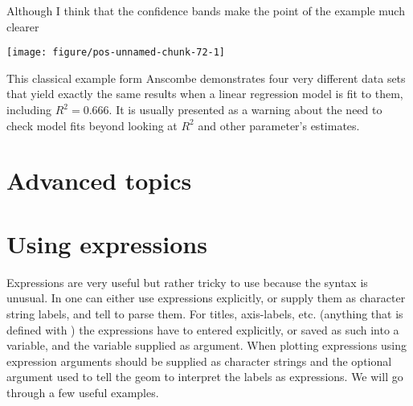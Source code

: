\documentclass[paper=a4,10pt,div=17,headsepline,BCOR=12mm,twoside,open=right]{scrbook}\usepackage{knitr}
\begin{document}
Although I think that the confidence bands make the point of the example much clearer

\begin{knitrout}\footnotesize
{}\color{fgcolor}\begin{kframe}
\begin{alltt}
  \hlopt{+}
  \hlstd{(}\hlstd{=}\hlstd{,} \hlstd{=}\hlstd{,} \hlstd{=}\hlstd{)} \hlopt{+}
  \hlstd{(}\hlstd{=}\hlstd{)} \hlopt{+}
  \hlstd{(}\hlopt{~} \hlstd{=}\hlstd{)} \hlopt{+}
  \hlstd{()}
\end{alltt}
\end{kframe}

{\centering \texttt{[image: figure/pos-unnamed-chunk-72-1]} 

}



\end{knitrout}

This classical example form Anscombe \cite{xxx} demonstrates four very different data sets that yield exactly the same results when a linear regression model is fit to them, including $R^2 = 0.666$. It is usually presented as a warning about the need to check model fits beyond looking at $R^2$ and other parameter's estimates.


\section{Advanced topics}

\section{Using  expressions}

Expressions are very useful but rather tricky to use because the syntax is unusual. In  one can either use expressions explicitly, or supply them as character string labels, and tell  to parse them. For titles, axis-labels, etc. (anything that is defined with ) the expressions have to entered explicitly, or saved as such into a variable, and the variable supplied as argument. When plotting expressions using  expression arguments should be supplied as character strings and the optional argument  used to tell the geom to interpret the labels as expressions. We will go through a few useful examples.
\end{document}
